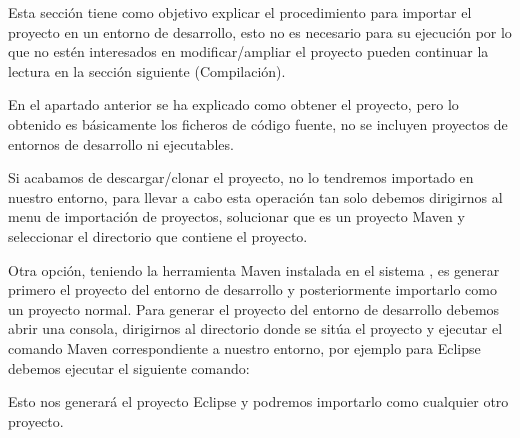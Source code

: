 Esta sección tiene como objetivo explicar el procedimiento para importar el proyecto en un entorno de desarrollo, esto no es necesario para su ejecución por lo que no estén interesados en modificar/ampliar el proyecto pueden continuar la lectura en la sección siguiente (Compilación).

En el apartado anterior se ha explicado como obtener el proyecto, pero lo obtenido es básicamente los ficheros de código fuente, no se incluyen proyectos de entornos de desarrollo ni ejecutables.

Si acabamos de descargar/clonar el proyecto, no lo tendremos importado en nuestro entorno, para llevar a cabo esta operación tan solo debemos dirigirnos al menu de importación de proyectos, solucionar que es un proyecto Maven y seleccionar el directorio que contiene el proyecto. 

Otra opción, teniendo la herramienta Maven instalada en el sistema \cite{instalacion_maven}, es generar primero el proyecto del entorno de desarrollo y posteriormente importarlo como un proyecto normal. Para generar el proyecto del entorno de desarrollo debemos abrir una consola, dirigirnos al directorio donde se sitúa el proyecto y ejecutar el comando Maven correspondiente a nuestro entorno, por ejemplo para Eclipse debemos ejecutar el siguiente comando:


Esto nos generar\'a el proyecto Eclipse y podremos importarlo como cualquier otro proyecto.